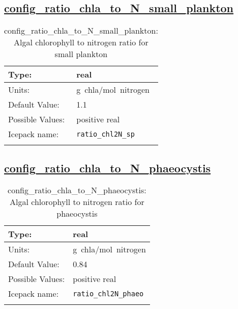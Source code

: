 \subsection[config\_ratio\_chla\_to\_N\_small\_plankton]{\hyperref[sec:nm_tab_biogeochemistry]{config\_ratio\_chla\_to\_N\_small\_plankton}}
\label{subsec:nm_sec_config_ratio_chla_to_N_small_plankton}
\begin{center}
\begin{longtable}{| p{2.0in} || p{4.0in} |}
    \hline
    Type: & real \\
    \hline
    Units: & \si{g.chla/mol.nitrogen} \\
    \hline
    Default Value: & 1.1 \\
    \hline
    Possible Values: & positive real \\
    \hline
    Icepack name: & \verb+ratio_chl2N_sp+ \\
    \hline
    \caption{config\_ratio\_chla\_to\_N\_small\_plankton: Algal chlorophyll to nitrogen ratio for small plankton}
\end{longtable}
\end{center}
\subsection[config\_ratio\_chla\_to\_N\_phaeocystis]{\hyperref[sec:nm_tab_biogeochemistry]{config\_ratio\_chla\_to\_N\_phaeocystis}}
\label{subsec:nm_sec_config_ratio_chla_to_N_phaeocystis}
\begin{center}
\begin{longtable}{| p{2.0in} || p{4.0in} |}
    \hline
    Type: & real \\
    \hline
    Units: & \si{g.chla/mol.nitrogen} \\
    \hline
    Default Value: & 0.84 \\
    \hline
    Possible Values: & positive real \\
    \hline
    Icepack name: & \verb+ratio_chl2N_phaeo+ \\
    \hline
    \caption{config\_ratio\_chla\_to\_N\_phaeocystis: Algal chlorophyll to nitrogen ratio for phaeocystis}
\end{longtable}
\end{center}
